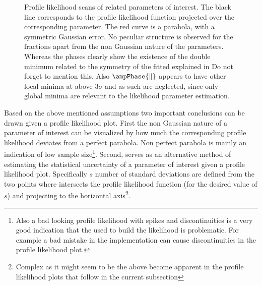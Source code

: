 \begin{figure}[h]
  \centering
  \begin{subfigure}{0.5\textwidth}
    \scalebox{0.60}{}
    \caption{}
    \label{nll_f0}
  \end{subfigure}%
  \hfill%
  \begin{subfigure}{0.5\textwidth}
    \scalebox{0.60}{}
    \caption{}
    \label{nll_fpar}
  \end{subfigure}
  \begin{subfigure}{0.5\textwidth}
    \scalebox{0.60}{}
    \caption{}
    \label{nll_AparPhase}
  \end{subfigure}%
  \hfill%
  \begin{subfigure}{0.5\textwidth}
    \scalebox{0.60}{}
    \caption{}
    \label{nll_AperpPhase}
  \end{subfigure}
\caption{Profile likelihood scans of \pwave related parameters of interest. The black line corresponds to the profile likelihood
         function projected over the corresponding parameter. The red curve is a parabola, with a symmetric Gaussian
         error. No peculiar structure is observed for the \pwave fractions apart from the non Gaussian nature of the parameters.
         Whereas the phases clearly show the existence of the double minimum related to the symmetry of the fitted \pdf
         explained in  {\color{red} Do not forget to mention this}.
         Also $\ampPhase{\parallel}$ appears to have other local minima at above $3\sigma$ and as such are neglected, since only
         global minima are relevant to the likelihood parameter estimation. }
\end{figure}

Based on the above mentioned assumptions two important conclusions can be drawn given a profile likelihood plot. First the non
Gaussian nature of a parameter of interest can be visualized by how much the corresponding profile likelihood deviates from
a perfect parabola. Non perfect parabola is mainly an indication of low sample
size\footnote{Also a bad looking profile likelihood with spikes and discontinuities is a very good indication that the \pdf
used to build the likelihood is problematic. For example a bad mistake in the implementation can cause discontinuities in the
profile likelihood plot.}. Second,  serves as an alternative method of estimating the statistical uncertainty
of a parameter of interest given a profile likelihood plot. Specifically $s$ number of standard deviations are defined from the two
points where  intersects the profile likelihood function (for the desired value of $s$) and projecting to
the horizontal
axis\footnote{Complex as it might seem to be the above become apparent in the profile likelihood plots that follow in the current subsection}.

